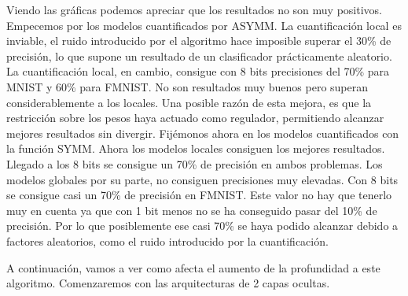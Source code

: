 Viendo las gráficas podemos apreciar que los resultados no son muy positivos. Empecemos por los modelos cuantificados por ASYMM. La cuantificación local es inviable, el ruido introducido por el algoritmo hace imposible superar el 30\% de precisión, lo que supone un resultado de un clasificador prácticamente aleatorio. La cuantificación local, en cambio, consigue con 8 bits precisiones del 70\% para MNIST y 60\% para FMNIST. No son resultados muy buenos pero superan considerablemente a los locales. Una posible razón de esta mejora, es que la restricción sobre los pesos haya actuado como regulador, permitiendo alcanzar mejores resultados sin divergir. Fijémonos ahora en los modelos cuantificados con la función SYMM. Ahora los modelos locales consiguen los mejores resultados. Llegado a los 8 bits se consigue un 70\% de precisión en ambos  problemas. Los modelos globales por su parte, no consiguen precisiones muy elevadas. Con 8 bits se consigue casi un 70\% de precisión en FMNIST. Este valor no hay que tenerlo muy en cuenta ya que con 1 bit menos no se ha conseguido pasar del 10\% de precisión. Por lo que posiblemente ese casi 70\% se haya podido alcanzar debido a factores aleatorios, como el ruido introducido por la cuantificación.

A continuación, vamos a ver como afecta el aumento de la profundidad a este algoritmo. Comenzaremos con las arquitecturas de 2 capas ocultas.


